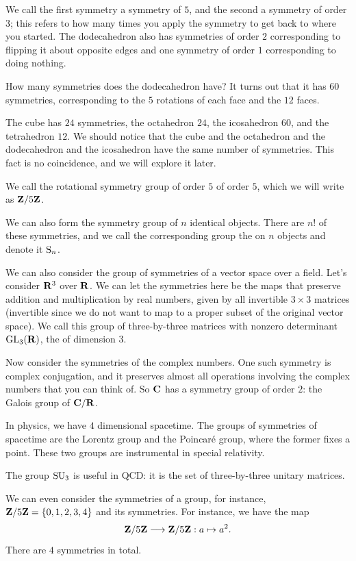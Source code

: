 \documentclass[11pt, oneside]{amsart}
\begin{document}
We call the first symmetry a symmetry of  $5$, and the second a symmetry of order $3$; this refers to how many times you apply the symmetry to get back to where you started. The dodecahedron also has symmetries of order $2$ corresponding to flipping it about opposite edges and one symmetry of order $1$ corresponding to doing nothing. 

How many symmetries does the dodecahedron have? It turns out that it has $60$ symmetries, corresponding to the $5$ rotations of each face and the $12$ faces.

The cube has $24$ symmetries, the octahedron $24$, the icosahedron $60$, and the tetrahedron $12$. We should notice that the cube and the octahedron and the dodecahedron and the icosahedron have the same number of symmetries. This fact is no coincidence, and we will explore it later.

We call the rotational symmetry group of order $5$  of order $5$, which we will write as $\mathbf Z/5\mathbf Z$.

We can also form the symmetry group of $n$ identical objects. There are $n!$ of these symmetries, and we call the corresponding group the  on $n$ objects and denote it $\operatorname{S}_n$. 

We can also consider the group of symmetries of a vector space over a field. Let's consider $\mathbf R^3$ over $\mathbf R$. We can let the symmetries here be the maps that preserve addition and multiplication by real numbers, given by all invertible $3\times 3$ matrices (invertible since we do not want to map to a proper subset of the original vector space). We call this group of three-by-three matrices with nonzero determinant $\operatorname{GL}_3(\mathbf R)$, the  of dimension $3$.

Now consider the symmetries of the complex numbers. One such symmetry is complex conjugation, and it preserves almost all operations involving the complex numbers that you can think of. So $\mathbf C$ has a symmetry group of order $2$: the Galois group of $\mathbf C/\mathbf R$.

In physics, we have $4$ dimensional spacetime. The groups of symmetries of spacetime are the Lorentz group and the Poincar\'e group, where the former fixes a point. These two groups are instrumental in special relativity. 

The group $\operatorname{SU}_3$ is useful in QCD: it is the set of three-by-three unitary matrices. 

We can even consider the symmetries of a group, for instance, $\mathbf Z/5\mathbf Z = \{0,1,2,3,4\}$ and its symmetries. For instance, we have the map
$$
\mathbf Z/5\mathbf Z\longrightarrow\mathbf Z/5\mathbf Z : a \mapsto a^2.
$$
There are $4$ symmetries in total.
\end{document}
